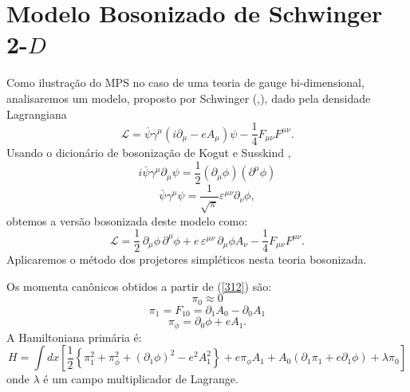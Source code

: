 \documentclass[a4paper,thmsa,12pt]{report}
\begin{document}
\section{{\sc Modelo Bosonizado de Schwinger 2-$D$}}

Como ilustra\c{c}\~{a}o do MPS no caso de uma teoria de gauge
bi-dimensional, analisaremos um modelo, proposto por Schwinger (\cite
{schwinger},\cite{swieca}), dado pela densidade Lagrangiana 
\begin{equation}
\mathcal{L=}\stackrel{\_}{\psi }\gamma ^{\mu }(i\partial _{\mu }-eA_{\mu
})\psi -\frac{1}{4}F_{\mu \nu }F^{\mu \nu }.  \label{309}
\end{equation}
Usando o dicion\'{a}rio de bosoniza\c{c}\~{a}o de Kogut e Susskind \cite
{kogut}, 
\begin{equation}
i\stackrel{\_}{\psi }\gamma ^{\mu }\partial _{\mu }\psi =\frac{1}{2}\left(
\partial _{\mu }\phi \right) \left( \partial ^{\mu }\phi \right)  \label{310}
\end{equation}
\begin{equation}
\stackrel{\_}{\psi }\gamma ^{\mu }\psi =\frac{1}{\sqrt{\pi }}\varepsilon
^{\mu \nu }\partial _{\nu }\phi ,  \label{311}
\end{equation}
obtemos a vers\~{a}o bosonizada deste modelo como: 
\begin{equation}
\mathcal{L=}\frac{1}{2}\,\partial _{\mu }\phi \,\partial ^{\mu }\phi
+e\,\varepsilon ^{\mu \nu }\,\partial _{\mu }\phi A_{\nu }-\frac{1}{4}F_{\mu \nu
}F^{\mu \nu }.  \label{312}
\end{equation}
Aplicaremos o m\'{e}todo dos projetores simpl\'{e}ticos nesta teoria
bosonizada.

Os momenta can\^{o}nicos obtidos a partir de (\ref{312}) s\~{a}o: 
\begin{equation}
\pi _{0}\approx 0  \label{313.1}
\end{equation}
\begin{equation}
\pi _{1}=F_{10}=\partial _{1}A_{0}-\partial _{0}A_{1}  \label{313.2}
\end{equation}
\begin{equation}
\pi _{\phi }=\partial _{0}\phi +eA_{1}.  \label{313.3}
\end{equation}
A Hamiltoniana prim\'{a}ria \'{e}: 
\begin{equation}
H =\int dx\left[\frac{1}{2}\left\{\pi _{1}^{2}+\pi _{\phi }^{2}+(\partial _{1}\phi
)^{2}-e^{2}A_{1}^{2}\right\} +e\pi _{\phi }A_{1}+A_{0}(\partial _{1}\pi _{1}+e\partial _{1}\phi
)+\lambda \pi _{0}\right]
\end{equation}
onde $\lambda $ \'{e} um campo multiplicador de Lagrange.
\end{document}
